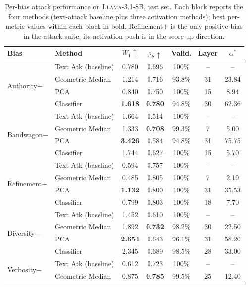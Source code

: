 \documentclass[11pt]{article}
\begin{document}
\begin{table}[h!]
\centering
\small
\setlength{\tabcolsep}{6pt}
\caption{Per-bias attack performance on \textsc{Llama-3.1-8B}, test set. Each block reports the four methods (text-attack baseline plus three activation methods); best per-metric values within each block in bold. Refinement$+$ is the only positive bias in the attack suite; its activation push is in the score-up direction.}
\label{tab:attack_per_bias}
\begin{tabular}{l l c c c c c}
\toprule
\textbf{Bias} & \textbf{Method} & $W_1 \uparrow$ & $\rho_S \uparrow$ & \textbf{Valid.} & \textbf{Layer} & $\alpha^{*}$ \\
\midrule
\multirow{4}{*}{Authority$-$}
 & Text Atk (baseline) & 0.780 & 0.696 & 100\% & -- & -- \\
 & Geometric Median & 1.214 & 0.716 & 93.8\% & 31 & 23.84 \\
 & PCA & 0.840 & 0.750 & 100\% & 15 & 8.94 \\
 & Classifier & \textbf{1.618} & \textbf{0.780} & 94.8\% & 30 & 62.36 \\
\midrule
\multirow{4}{*}{Bandwagon$-$}
 & Text Atk (baseline) & 1.664 & 0.514 & 100\% & -- & -- \\
 & Geometric Median & 1.333 & \textbf{0.708} & 99.3\% & 7 & 5.00 \\
 & PCA & \textbf{3.426} & 0.584 & 94.8\% & 31 & 75.75 \\
 & Classifier & 1.744 & 0.627 & 100\% & 15 & 5.70 \\
\midrule
\multirow{4}{*}{Refinement$-$}
 & Text Atk (baseline) & 0.594 & 0.757 & 100\% & -- & -- \\
 & Geometric Median & 0.485 & 0.805 & 100\% & 7 & 2.19 \\
 & PCA & \textbf{1.132} & 0.800 & 100\% & 31 & 35.53 \\
 & Classifier & 0.799 & 0.803 & 100\% & 18 & 7.70 \\
\midrule
\multirow{4}{*}{Diversity$-$}
 & Text Atk (baseline) & 1.452 & 0.610 & 100\% & -- & -- \\
 & Geometric Median & 1.892 & \textbf{0.732} & 98.2\% & 30 & 22.50 \\
 & PCA & \textbf{2.654} & 0.643 & 96.1\% & 31 & 58.20 \\
 & Classifier & 2.345 & 0.689 & 98.5\% & 28 & 33.00 \\
\midrule
\multirow{4}{*}{Verbosity$-$}
 & Text Atk (baseline) & 0.612 & 0.723 & 100\% & -- & -- \\
 & Geometric Median & 0.875 & \textbf{0.785} & 99.5\% & 25 & 12.40 \\

\end{tabular}
\end{table}
\end{document}
